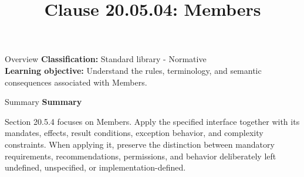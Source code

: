 \documentclass[10pt,letterpaper]{article}
\title{Clause 20.05.04: Members}
\author{}
\date{}
\begin{document}
\maketitle
\begin{CornellOverviewBox}{Overview}
\textbf{Classification:} Standard library - Normative\\[2pt]
\textbf{Learning objective:} Understand the rules, terminology, and semantic consequences associated with Members.
\end{CornellOverviewBox}\begin{CornellSummaryBox}{Summary}
{\sffamily\bfseries\color{Accent} Summary}\par\vspace{3pt}Section 20.5.4 focuses on Members. Apply the specified interface together with its mandates, effects, result conditions, exception behavior, and complexity constraints. When applying it, preserve the distinction between mandatory requirements, recommendations, permissions, and behavior deliberately left undefined, unspecified, or implementation-defined.
\end{CornellSummaryBox}
\end{document}
